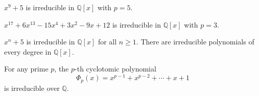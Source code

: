 \begin{example}
    $x^9 + 5$ is irreducible in $\mathbb{Q}[x]$ with $p=5$.
\end{example}

\begin{example}
    $x^{17} + 6x^{13} - 15x^{4} + 3x^2 - 9x + 12$ is irreducible in $\mathbb{Q}[x]$ with $p=3$.
\end{example}

\begin{example}
    $x^n + 5$ is irreducible in $\mathbb{Q}[x]$ for all $n \geq 1$. There are irreducible polynomials of 
    every degree in $\mathbb{Q}[x]$.
\end{example}

\begin{corollary}
    For any prime $p$, the $p$-th cyclotomic polynomial
    \[
        \Phi_p(x) = x^{p-1} + x^{p-2} + \cdots + x + 1
    \]
    is irreducible over $\mathbb{Q}$.
\end{corollary}
